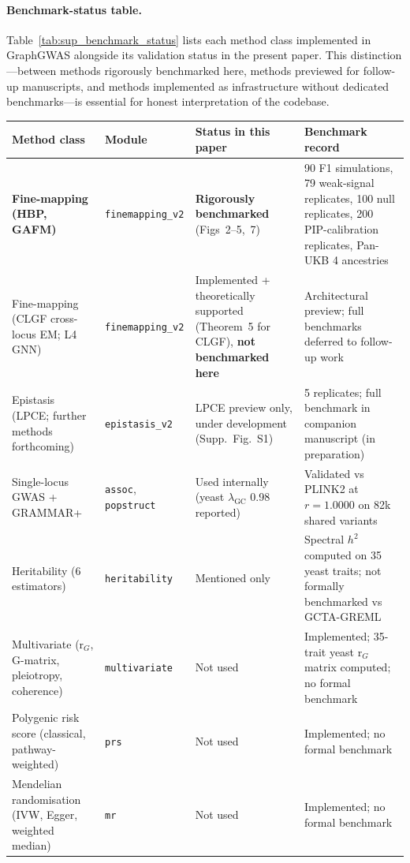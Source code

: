 \paragraph{Benchmark-status table.}
Table~\ref{tab:sup_benchmark_status} lists each method class
implemented in GraphGWAS alongside its validation status in the
present paper. This distinction---between methods rigorously
benchmarked here, methods previewed for follow-up manuscripts, and
methods implemented as infrastructure without dedicated
benchmarks---is essential for honest interpretation of the
codebase.

\begin{table}[htbp]
\centering
\small
\begin{tabular}{p{}p{}p{}p{}}
\toprule
Method class & Module & Status in this paper & Benchmark record \\
\midrule
\textbf{Fine-mapping (HBP, GAFM)} & \texttt{finemapping\_v2} & \textbf{Rigorously benchmarked} (Figs~2--5,~7) & 90 F1 simulations, 79 weak-signal replicates, 100 null replicates, 200 PIP-calibration replicates, Pan-UKB 4 ancestries \\
\midrule
Fine-mapping (CLGF cross-locus EM; L4 GNN) & \texttt{finemapping\_v2} & Implemented + theoretically supported (Theorem~5 for CLGF), \textbf{not benchmarked here} & Architectural preview; full benchmarks deferred to follow-up work \\
\midrule
Epistasis (LPCE; further methods forthcoming) & \texttt{epistasis\_v2} & LPCE preview only, under development (Supp.~Fig.~S1) & 5 replicates; full benchmark in companion manuscript (in preparation) \\
\midrule
Single-locus GWAS + GRAMMAR+ & \texttt{assoc},\,\texttt{popstruct} & Used internally (yeast $\lambda_{\text{GC}}$ 0.98 reported) & Validated vs PLINK2 at $r = 1.0000$ on 82k shared variants \\
\midrule
Heritability (6 estimators) & \texttt{heritability} & Mentioned only & Spectral $h^2$ computed on 35 yeast traits; not formally benchmarked vs GCTA-GREML \\
\midrule
Multivariate (r$_G$, G-matrix, pleiotropy, coherence) & \texttt{multivariate} & Not used & Implemented; 35-trait yeast r$_G$ matrix computed; no formal benchmark \\
\midrule
Polygenic risk score (classical, pathway-weighted) & \texttt{prs} & Not used & Implemented; no formal benchmark \\
\midrule
Mendelian randomisation (IVW, Egger, weighted median) & \texttt{mr} & Not used & Implemented; no formal benchmark \\

\end{tabular}
\end{table}

